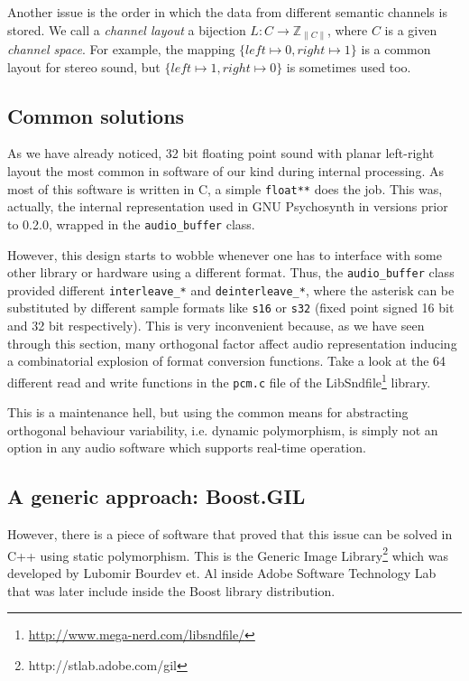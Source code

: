 Another issue is the order in which the data from different semantic
channels is stored. We call a \emph{channel layout} a bijection $L : C
\rightarrow \mathbb{Z}_{\|C\|}$, where $C$ is a given \emph{channel
  space}. For example, the mapping $\{ left
\mapsto 0, right \mapsto 1 \}$ is a common layout for stereo sound,
but $\{ left \mapsto 1, right \mapsto 0 \}$ is sometimes used too.

\subsection{Common solutions}

As we have already noticed, 32 bit floating point sound with planar
left-right layout the most common in software of our kind during
internal processing. As most of this software is written in C, a
simple \texttt{float**} does the job. This was, actually, the internal
representation used in GNU Psychosynth in versions prior to 0.2.0,
wrapped in the \texttt{audio\_buffer} class.

However, this design starts to wobble whenever one has to interface
with some other library or hardware using a different format. Thus,
the \texttt{audio\_buffer} class provided different
\texttt{interleave\_*} and \texttt{deinterleave\_*}, where the
asterisk can be substituted by different sample formats like
\texttt{s16} or \texttt{s32} (fixed point signed 16 bit and 32 bit
respectively). This is very inconvenient because, as we have seen
through this section, many orthogonal factor affect audio
representation inducing a combinatorial explosion of format conversion
functions. Take a look at the 64 different read and write functions in
the \texttt{pcm.c} file of the
LibSndfile\footnote{\url{http://www.mega-nerd.com/libsndfile/}}
library.

This is a maintenance hell, but using the common means for abstracting
orthogonal behaviour variability, i.e. dynamic polymorphism, is simply
not an option in any audio software which supports real-time operation.

\subsection{A generic approach: Boost.GIL}

However, there is a piece of software that proved that this issue can be
solved in C++ using static polymorphism. This is the Generic
Image Library\footnote{http://stlab.adobe.com/gil} which was developed
by Lubomir Bourdev et. Al inside Adobe Software Technology Lab that was
later include inside the Boost library distribution.

